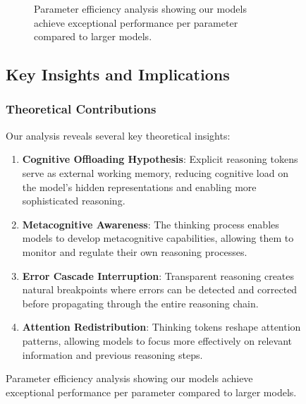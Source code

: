 \begin{table}[H]
\begin{figure}[H]
\begin{figure}[H]
\caption{Parameter efficiency analysis showing our models achieve exceptional performance per parameter compared to larger models.}
\label{fig:scaling-efficiency}
\end{figure}

\subsection{Key Insights and Implications}

\subsubsection{Theoretical Contributions}

Our analysis reveals several key theoretical insights:

\begin{enumerate}
    \item \textbf{Cognitive Offloading Hypothesis}: Explicit reasoning tokens serve as external working memory, reducing cognitive load on the model's hidden representations and enabling more sophisticated reasoning.

    \item \textbf{Metacognitive Awareness}: The thinking process enables models to develop metacognitive capabilities, allowing them to monitor and regulate their own reasoning processes.

    \item \textbf{Error Cascade Interruption}: Transparent reasoning creates natural breakpoints where errors can be detected and corrected before propagating through the entire reasoning chain.

    \item \textbf{Attention Redistribution}: Thinking tokens reshape attention patterns, allowing models to focus more effectively on relevant information and previous reasoning steps.
\end{enumerate}


\end{figure}
\end{table}
